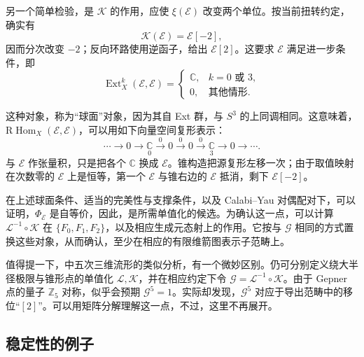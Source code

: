 另一个简单检验，是 $\mathcal{K}$ 的作用，应使 $\xi(\mathcal{E})$ 改变两个单位。按当前扭转约定，确实有
\[
\mathcal{K}(\mathcal{E})=\mathcal{E}[-2],
\]
因而分次改变 $-2$；反向环路使用逆函子，给出 $\mathcal{E}[2]$。这要求 $\mathcal{E}$ 满足进一步条件，即
\begin{equation}\label{eq:5.179}
\operatorname{Ext}_X^k(\mathcal{E},\mathcal{E})
=\begin{cases}
\mathbb{C},&k=0\text{ 或 }3,\\
0,&\text{其他情形}.
\end{cases}
\end{equation}

这种对象，称为“球面”对象，因为其自 Ext 群，与 $S^3$ 的上同调相同。这意味着，$\mathrm{R}\operatorname{Hom}_X(\mathcal{E},\mathcal{E})$，可以用如下向量空间复形表示：
\begin{equation}\label{eq:5.180}
\cdots\to0\to\underset{\scriptscriptstyle0}{\mathbb{C}}
\xrightarrow{0}0\xrightarrow{0}0\xrightarrow{0}
\underset{\scriptscriptstyle3}{\mathbb{C}}\to0\to\cdots.
\end{equation}
与 $\mathcal{E}$ 作张量积，只是把各个 $\mathbb{C}$ 换成 $\mathcal{E}$。锥构造把源复形左移一次；由于取值映射在次数零的 $\mathcal{E}$ 上是恒等，第一个 $\mathcal{E}$ 与锥右边的 $\mathcal{E}$ 抵消，剩下 $\mathcal{E}[-2]$。

在上述球面条件、适当的完美性与支撑条件，以及 Calabi--Yau 对偶配对下，可以证明，$\Phi_{\mathcal{E}}$ 是自等价，因此，是所需单值化的候选。为确认这一点，可以计算 $\mathcal{L}^{-1}\circ\mathcal{K}$ 在 $\{F_0,F_1,F_2\}$，以及相应生成元态射上的作用。它按与 $\mathcal{G}$ 相同的方式置换这些对象，从而确认，至少在相应的有限维箭图表示子范畴上。

值得提一下，中五次三维流形的类似分析，有一个微妙区别。仍可分别定义绕大半径极限与锥形点的单值化 $\mathcal{L},\mathcal{K}$，并在相应约定下令 $\mathcal{G}=\mathcal{L}^{-1}\circ\mathcal{K}$。由于 Gepner 点的量子 $\mathbb{Z}_5$ 对称，似乎会预期 $\mathcal{G}^5=1$。实际却发现，$\mathcal{G}^5$ 对应于导出范畴中的移位“$[2]$”。可以用矩阵分解理解这一点，不过，这里不再展开。

\subsection{稳定性的例子}\label{sec:5.6.3}

